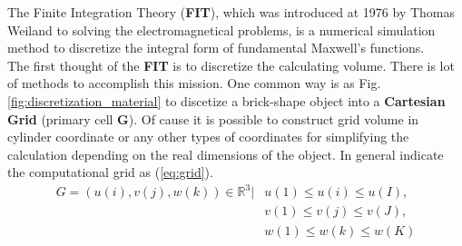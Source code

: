 The Finite Integration Theory (\textbf{FIT}), which was introduced at 1976 by Thomas Weiland\cite{FIT_discrete_method} to solving the electromagnetical problems, is a numerical simulation method to discretize the integral form of fundamental Maxwell's functions.\\

The first thought of the \textbf{FIT} is to discretize the calculating volume. There is lot of methods to accomplish this mission. One common way is as Fig. \ref{fig:discretization_material} to discetize a brick-shape object into a \textbf{Cartesian Grid} (primary cell \textbf{G}). Of cause it is possible to construct grid volume in cylinder coordinate or any other types of  coordinates\cite{FIT_triangular_discretization,FDTD_nonorthogonal_grids} for simplifying the calculation depending on the real dimensions of the object. In general \cite{script_FeldSim} indicate the computational grid as (\ref{eq:grid}).\\
\begin{align}
G=
(u(i),v(j),w(k))\in \mathbb{R}^3|&u(1)\leq u(i)\leq u(I),\nonumber\\
													 &v(1)\leq v(j)\leq v(J),\nonumber\\ 
													 &w(1)\leq w(k)\leq w(K)
\label{eq:grid}
\end{align}

